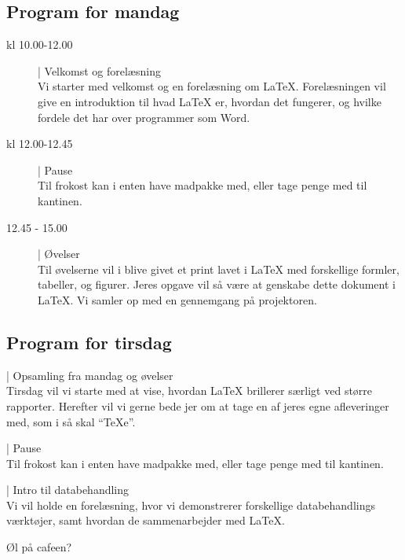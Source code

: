 \documentclass{article}                                                        %
\begin{document}
    \subsection{Program for mandag}
    \begin{description}
        \item[kl 10.00-12.00] | Velkomst og forelæsning \\        
        Vi starter med velkomst og en forelæsning om LaTeX.
        Forelæsningen vil give en introduktion til hvad LaTeX er, hvordan det
        fungerer, og hvilke fordele det har over programmer som Word.
        
        \item[kl 12.00-12.45] | Pause ~ \\
        Til frokost kan i enten have madpakke med, eller tage penge med til
        kantinen.

        \item[12.45 - 15.00] | Øvelser ~ \\
        Til øvelserne vil i blive givet et print lavet i LaTeX med forskellige
        formler, tabeller, og figurer. Jeres opgave vil så være at genskabe
        dette dokument i LaTeX. Vi samler op med en gennemgang på projektoren.
    \end{description}



    \subsection{Program for tirsdag}
    \begin{description}
        \item[kl 10.00-12.00] | Opsamling fra mandag og øvelser ~ \\
        Tirsdag vil vi starte med at vise, hvordan LaTeX brillerer særligt
        ved større rapporter. Herefter vil vi gerne bede jer om at tage en af
        jeres egne afleveringer med, som i så skal ``TeXe''.

        \item[kl 12.00-12.45] | Pause ~ \\
        Til frokost kan i enten have madpakke med, eller tage penge med til
        kantinen.

        \item[12.45 - 15.00] | Intro til databehandling ~ \\
        Vi vil holde en forelæsning, hvor vi demonstrerer forskellige databehandlings
        værktøjer, samt hvordan de sammenarbejder med LaTeX.
        
        \item Øl på cafeen? 
    \end{description}
 
\end{document}
